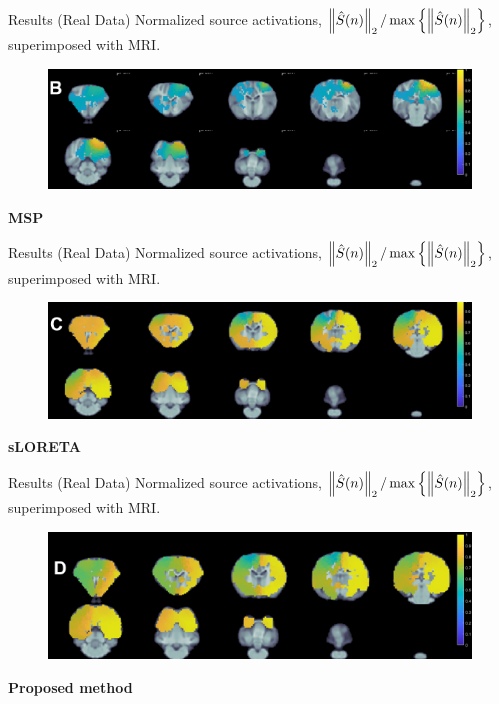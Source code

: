 \documentclass[progressbar=head]{beamer}
\begin{document}
\begin{frame}{Results (Real Data)}
Normalized source activations, $\left\lVert \hat{S}(n) \right\rVert_2/\max\left\{ \left\lVert \hat{S}(n) \right\rVert_2 \right\}$, superimposed with MRI.
\begin{figure}
\centering
\includegraphics[width=0.99\linewidth]{./img_dev3/proposed_B}
\end{figure}
\textbf{MSP}
\end{frame}

\begin{frame}{Results (Real Data)}
Normalized source activations, $\left\lVert \hat{S}(n) \right\rVert_2/\max\left\{ \left\lVert \hat{S}(n) \right\rVert_2 \right\}$, superimposed with MRI.
\begin{figure}
\centering
\includegraphics[width=0.99\linewidth]{./img_dev3/proposed_C}
\end{figure}
\textbf{sLORETA}
\end{frame}

\begin{frame}{Results (Real Data)}
Normalized source activations, $\left\lVert \hat{S}(n) \right\rVert_2/\max\left\{ \left\lVert \hat{S}(n) \right\rVert_2 \right\}$, superimposed with MRI.
\begin{figure}
\centering
\includegraphics[width=0.99\linewidth]{./img_dev3/proposed_D}
\end{figure}
\textbf{Proposed method}
\end{frame}
\end{document}

